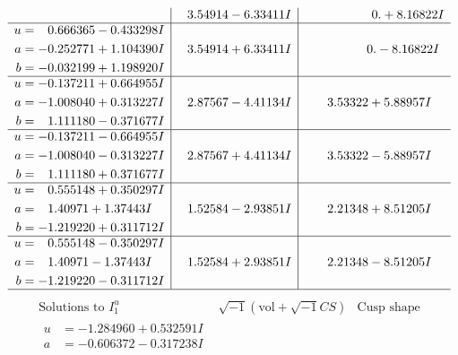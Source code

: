 \documentclass[1p]{elsarticle_modified}
\theoremstyle{definition}
\newcommand{\I}{\sqrt{-1}}
\begin{document}
$$\begin{array}{c|c|c}
 & \phantom{-}3.54914 - 6.33411 I & \phantom{-0.000000 -}0. + 8.16822 I \\ \hline\begin{aligned}
u &= \phantom{-}0.666365 - 0.433298 I \\
a &= -0.252771 + 1.104390 I \\
b &= -0.032199 + 1.198920 I\end{aligned}
 & \phantom{-}3.54914 + 6.33411 I & \phantom{-0.000000 } 0. - 8.16822 I \\ \hline\begin{aligned}
u &= -0.137211 + 0.664955 I \\
a &= -1.008040 + 0.313227 I \\
b &= \phantom{-}1.111180 - 0.371677 I\end{aligned}
 & \phantom{-}2.87567 - 4.41134 I & \phantom{-}3.53322 + 5.88957 I \\ \hline\begin{aligned}
u &= -0.137211 - 0.664955 I \\
a &= -1.008040 - 0.313227 I \\
b &= \phantom{-}1.111180 + 0.371677 I\end{aligned}
 & \phantom{-}2.87567 + 4.41134 I & \phantom{-}3.53322 - 5.88957 I \\ \hline\begin{aligned}
u &= \phantom{-}0.555148 + 0.350297 I \\
a &= \phantom{-}1.40971 + 1.37443 I \\
b &= -1.219220 + 0.311712 I\end{aligned}
 & \phantom{-}1.52584 - 2.93851 I & \phantom{-}2.21348 + 8.51205 I \\ \hline\begin{aligned}
u &= \phantom{-}0.555148 - 0.350297 I \\
a &= \phantom{-}1.40971 - 1.37443 I \\
b &= -1.219220 - 0.311712 I\end{aligned}
 & \phantom{-}1.52584 + 2.93851 I & \phantom{-}2.21348 - 8.51205 I\\
 \hline 
 \end{array}$$\newpage$$\begin{array}{c|c|c}  
\text{Solutions to }I^u_{1}& \I (\text{vol} + \sqrt{-1}CS) & \text{Cusp shape}\\
 \hline 
\begin{aligned}
u &= -1.284960 + 0.532591 I \\
a &= -0.606372 - 0.317238 I \\

\end{aligned}
\end{array}$$
\end{document}
